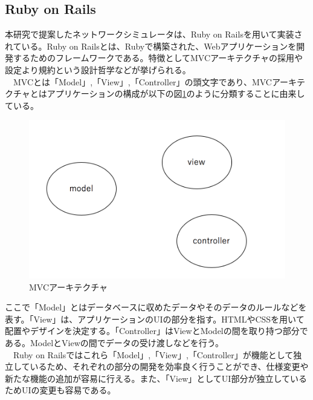 \subsection{Ruby on Rails}
\label{tag:rails}
本研究で提案したネットワークシミュレータは、Ruby on Railsを用いて実装されている。Ruby on Railsとは、Rubyで構築された、Webアプリケーションを開発するためのフレームワークである。特徴としてMVCアーキテクチャの採用や設定より規約という設計哲学などが挙げられる。\\
　MVCとは「Model」,「View」,「Controller」の頭文字であり、MVCアーキテクチャとはアプリケーションの構成が以下の図\ref{fig:MVC}のように分類することに由来している。
\begin{figure}[htbp]
  \begin{center}
    \includegraphics[scale=0.3]{img/mvc.png}
    \caption{MVCアーキテクチャ}
    \label{fig:MVC}
  \end{center}
\end{figure}

ここで「Model」とはデータベースに収めたデータやそのデータのルールなどを表す。「View」は、アプリケーションのUIの部分を指す。HTMLやCSSを用いて配置やデザインを決定する。「Controller」はViewとModelの間を取り持つ部分である。ModelとViewの間でデータの受け渡しなどを行う。\\
　Ruby on Railsではこれら「Model」,「View」,「Controller」が機能として独立しているため、それぞれの部分の開発を効率良く行うことができ、仕様変更や新たな機能の追加が容易に行える。また、「View」としてUI部分が独立しているためUIの変更も容易である。
